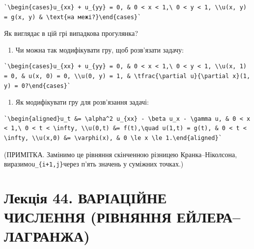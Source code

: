 \documentclass[
  ukrainian,
]{article}
\providecommand{\tightlist}{%
  \setlength{\itemsep}{0pt}\setlength{\parskip}{0pt}}
\begin{document}
\begin{verbatim}
`\begin{cases}u_{xx} + u_{yy} = 0, & 0 < x < 1,\ 0 < y < 1, \\u(x, y) = g(x, y) & \text{на межі?}\end{cases}`
\end{verbatim}

Як виглядає в цій грі випадкова прогулянка?

\begin{enumerate}
\def\labelenumi{\arabic{enumi}.}
\setcounter{enumi}{3}
\tightlist
\item
  Чи можна так модифікувати гру, щоб розв'язати задачу:
\end{enumerate}

\begin{verbatim}
`\begin{cases}u_{xx} + u_{yy} = 0, & 0 < x < 1,\ 0 < y < 1, \\u(x, 1) = 0, & u(x, 0) = 0, \\u(0, y) = 1, & \tfrac{\partial u}{\partial x}(1, y) = 0?\end{cases}`
\end{verbatim}

\begin{enumerate}
\def\labelenumi{\arabic{enumi}.}
\setcounter{enumi}{4}
\tightlist
\item
  Як модифікувати гру для розв'язання задачі:
\end{enumerate}

\begin{verbatim}
`\begin{aligned}u_t &= \alpha^2 u_{xx} - \beta u_x - \gamma u, & 0 < x < 1,\ 0 < t < \infty, \\u(0,t) &= f(t),\quad u(1,t) = g(t), & 0 < t < \infty, \\u(x,0) &= \varphi(x), & 0 \le x \le 1.\end{aligned}`
\end{verbatim}

(ПРИМІТКА. Замінимо це рівняння скінченною різницею Кранка--Ніколсона,
виразимо\texttt{u\_\{i+1,j\}}через п'ять значень у суміжних точках.)

\section{Лекція 44. ВАРІАЦІЙНЕ ЧИСЛЕННЯ (РІВНЯННЯ
ЕЙЛЕРА--ЛАГРАНЖА)}\label{ux43bux435ux43aux446ux456ux44f-44.-ux432ux430ux440ux456ux430ux446ux456ux439ux43dux435-ux447ux438ux441ux43bux435ux43dux43dux44f-ux440ux456ux432ux43dux44fux43dux43dux44f-ux435ux439ux43bux435ux440ux430ux43bux430ux433ux440ux430ux43dux436ux430}
\end{document}
